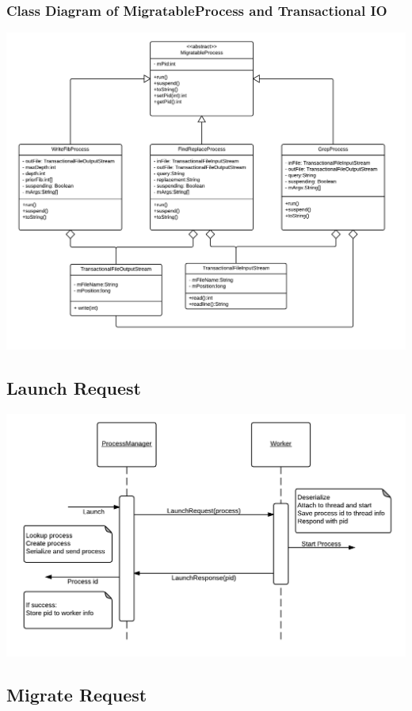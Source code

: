\documentclass[12pt]{article}
\begin{document}
\subsubsection{Class Diagram of MigratableProcess and Transactional IO}
\includegraphics[scale=.3]{migratableProcess.png}

\subsection{Launch Request}

\includegraphics[scale=.4]{launch.png}


\subsection{Migrate Request}
\end{document}
